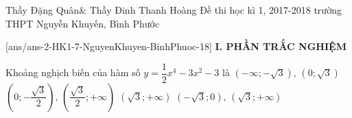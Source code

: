 \begin{name}
{Thầy Đặng Quân\& Thầy Đinh Thanh Hoàng}
{Đề thi học kì 1, 2017-2018 trường THPT Nguyễn Khuyến, Bình Phước}
\end{name}
\setcounter{ex}{0}\setcounter{bt}{0}
[ans/ans-2-HK1-7-NguyenKhuyen-BinhPhuoc-18]
\noindent\textbf{I. PHẦN TRẮC NGHIỆM}
\begin{ex}%
Khoảng nghịch biến của hàm số $y=\dfrac{1}{2}x^4-3x^2-3$ là
\choice 
{\True $\left(-\infty;-\sqrt{3}\right),\, \left(0;\sqrt{3}\right)$}
{$\left(0;-\dfrac{\sqrt{3}}{2}\right),\, \left(\dfrac{\sqrt{3}}{2};+\infty\right)$}
{$\left(\sqrt{3};+\infty\right)$}
{$\left(-\sqrt{3};0\right),\, \left(\sqrt{3};+\infty\right)$}

\end{ex}

